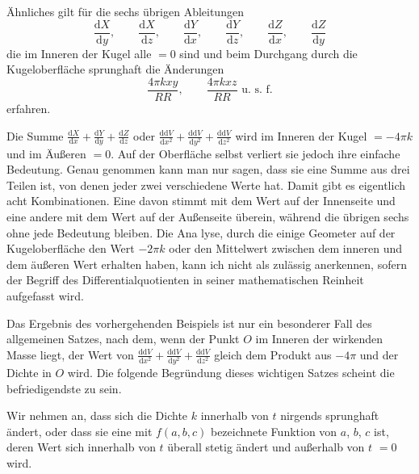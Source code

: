 Ähnliches gilt für die sechs übrigen Ableitungen
\[
\frac{\mathrm{d}X}{\mathrm{d}y},\qquad \frac{\mathrm{d}X}{\mathrm{d}z},\qquad \frac{\mathrm{d}Y}{\mathrm{d}x},\qquad \frac{\mathrm{d}Y}{\mathrm{d}z},\qquad \frac{\mathrm{d}Z}{\mathrm{d}x},\qquad \frac{\mathrm{d}Z}{\mathrm{d}y}
\]
die im Inneren der Kugel alle $=0$ sind und beim Durchgang durch die Kugeloberfläche sprunghaft die Änderungen
\[
\frac{4\pi kxy}{RR},\qquad \frac{4\pi kxz}{RR}\text{ u. s. f.}
\]
erfahren.

Die Summe $\frac{\mathrm{d}X}{\mathrm{d}x}+\frac{\mathrm{d}Y}{\mathrm{d}y}+\frac{\mathrm{d}Z}{\mathrm{d}z}$ oder $\frac{\mathrm{d}\mathrm{d}V}{\mathrm{d}x^2}+\frac{\mathrm{d}\mathrm{d}V}{\mathrm{d}y^2}+\frac{\mathrm{d}\mathrm{d}V}{\mathrm{d}z^2}$ wird im Inneren der Kugel $=-4\pi k$ und im Äußeren $=0$. Auf der Oberfläche selbst verliert sie jedoch ihre einfache Bedeutung. Genau genommen kann man nur sagen, dass sie eine Summe aus drei Teilen ist, von denen jeder zwei verschiedene Werte hat. Damit gibt es eigentlich acht Kombinationen. Eine davon stimmt mit dem Wert auf der Innenseite und eine andere mit dem Wert auf der Außenseite überein, während die übrigen sechs ohne jede Bedeutung bleiben. Die Ana%
lyse, durch die einige Geometer auf der Kugeloberfläche den Wert $-2\pi k$ oder den Mittelwert zwischen dem inneren und dem äußeren Wert erhalten haben, kann ich nicht als zulässig anerkennen, sofern der Begriff des Differentialquotienten in seiner mathematischen Reinheit aufgefasst wird.

Das Ergebnis des vorhergehenden Beispiels ist nur ein besonderer Fall des allgemeinen Satzes, nach dem, wenn der Punkt $O$ im Inneren der wirkenden Masse liegt, der Wert von $\frac{\mathrm{d}\mathrm{d}V}{\mathrm{d}x^2}+\frac{\mathrm{d}\mathrm{d}V}{\mathrm{d}y^2}+\frac{\mathrm{d}\mathrm{d}V}{\mathrm{d}z^2}$ gleich dem Produkt aus $-4\pi$ und der Dichte in $O$ wird. Die folgende Begründung dieses wichtigen Satzes scheint die befriedigendste zu sein.

Wir nehmen an, dass sich die Dichte $k$ innerhalb von $t$ nirgends sprunghaft ändert, oder dass sie eine mit $f(a,b,c)$ bezeichnete Funktion von $a$, $b$, $c$ ist, deren Wert sich innerhalb von $t$ überall stetig ändert und außerhalb von $t$ $=0$ wird.

